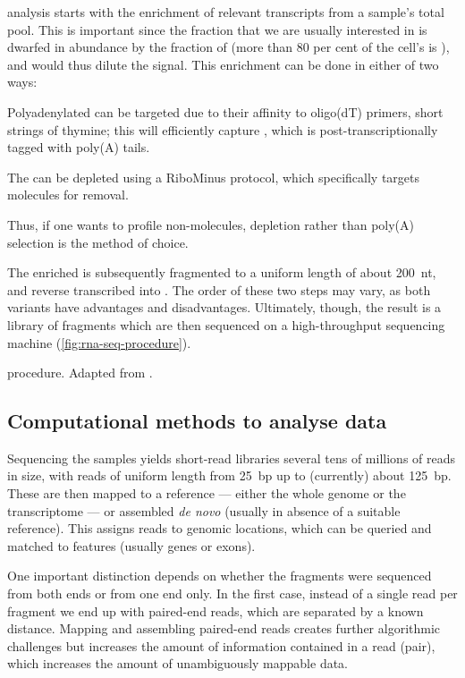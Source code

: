 \rnaseq analysis starts with the enrichment of relevant transcripts from a
sample’s total \rna pool. This is important since the \rna fraction that we are
usually interested in is dwarfed in abundance by the fraction of \rrna (more
than \num{80} per cent of the cell’s \rna is \rrna), and would thus dilute the
signal. This enrichment can be done in either of two ways:
\begin{enumerate*}
    \item Polyadenylated \rna can be targeted due to their affinity to oligo(dT)
        primers, short strings of thymine; this will efficiently capture \mrna,
        which is post-transcriptionally \threep tagged with poly(A) tails.
    \item The \rna can be \rrna depleted using a RiboMinus protocol, which
        specifically targets \rrna molecules for removal.
\end{enumerate*}
Thus, if one wants to profile non-\mrna molecules, \rrna depletion rather than
poly(A) selection is the method of choice.

The enriched \rna is subsequently fragmented to a uniform length of about
\SI{200}{nt}, and reverse transcribed into \cdna. The order of these two steps
may vary, as both variants have advantages and disadvantages. Ultimately,
though, the result is a \cdna library of fragments which are then sequenced on a
high-throughput sequencing machine (\cref{fig:rna-seq-procedure}).

    {\rnaseq procedure.}
    {Adapted from \citet{Mortazavi:2008}.}

\subsection{Computational methods to analyse  data}

Sequencing the \rnaseq samples yields short-read libraries several tens of
millions of reads in size, with reads of uniform length from \SI{25}{bp} up to
(currently) about \SI{125}{bp}. These are then mapped to a reference --- either
the whole genome or the transcriptome --- or assembled \emph{de novo} (usually
in absence of a suitable reference). This assigns reads to genomic locations,
which can be queried and matched to features (usually genes or exons).

One important distinction depends on whether the \cdna fragments were sequenced
from both ends or from one end only. In the first case, instead of a single read
per fragment we end up with paired-end reads, which are separated by a known
distance. Mapping and assembling paired-end reads creates further algorithmic
challenges but increases the amount of information contained in a read (pair),
which increases the amount of unambiguously mappable data.

